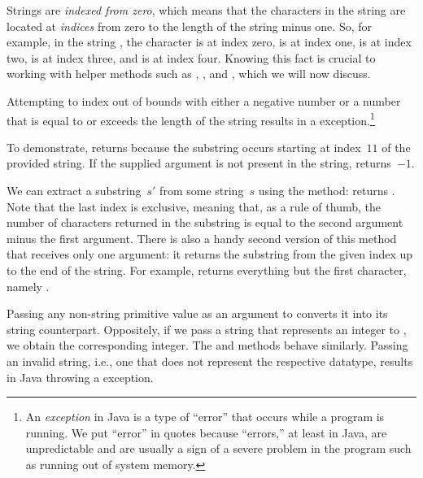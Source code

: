 Strings are \emph{indexed from zero}, which means that the characters in the string are located at \emph{indices} from zero to the length of the string minus one. 
So, for example, in the string , the character  is at index zero,  is at index one,  is at index two,  is at index three, and  is at index four. 
Knowing this fact is crucial to working with helper methods such as , , and , which we will now discuss.

Attempting to index out of bounds with either a negative number or a number that is equal to or exceeds the length of the string results in a  exception.\footnote{An \emph{exception} in Java is a type of ``error'' that occurs while a program is running. We put ``error'' in quotes because ``errors,'' at least in Java, are unpredictable and are usually a sign of a severe problem in the program such as running out of system memory.}

To demonstrate,  returns  because the substring  occurs starting at index~$11$ of the provided string. 
If the supplied argument is not present in the string,  returns~$-1$.

We can extract a substring~$s'$ from some string~$s$ using the  method:  returns . 
Note that the last index is exclusive, meaning that, as a rule of thumb, the number of characters returned in the substring is equal to the second argument minus the first argument. 
There is also a handy second version of this method that receives only one argument: it returns the substring from the given index up to the end of the string. 
For example,  returns everything but the first character, namely .

Passing any non-string primitive value as an argument to  converts it into its string counterpart.
Oppositely, if we pass a string that represents an integer to , we obtain the corresponding integer. 
The  and  methods behave similarly. 
Passing an invalid string, i.e., one that does not represent the respective datatype, results in Java throwing a  exception.

